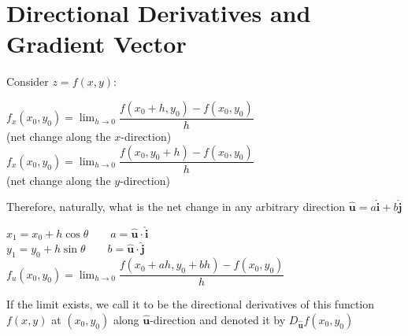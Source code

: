 \documentclass[UTF8,a4paper, 10pt, openany]{book}
\begin{document}
\section{Directional Derivatives and Gradient Vector}
Consider $z=f(x,y)$:
\begin{center}
$f_x(x_0,y_0)=\displaystyle\lim_{h\to 0}\dfrac{f(x_0+h,y_0)-f(x_0,y_0)}{h}$\\ (net change along the $x$-direction)\\
$f_x(x_0,y_0)=\displaystyle\lim_{h\to 0}\dfrac{f(x_0,y_0+h)-f(x_0,y_0)}{h}$\\ (net change along the $y$-direction)
\end{center}
Therefore, naturally, what is the net change in any arbitrary direction $\mathbf{\hat{u}}=a\mathbf{\hat{i}}+b\mathbf{\hat{j}}$
\begin{center}
$x_1=x_0+h\cos\theta \qquad a=\mathbf{\hat{u}}\cdot \mathbf{\hat{i}}$\\
$y_1=y_0+h\sin\theta \qquad b=\mathbf{\hat{u}}\cdot \mathbf{\hat{j}}$\\
$f_u(x_0,y_0)=\displaystyle\lim_{h\to 0}\dfrac{f(x_0+ah,y_0+bh)-f(x_0,y_0)}{h}$
\end{center}
If the limit exists, we call it to be the directional derivatives of this function $f(x,y)$ at $(x_0,y_0)$ along $\mathbf{\hat{u}}$-direction and denoted it by $D_{\mathbf{\hat{u}}}f(x_0,y_0)$
\end{document}
